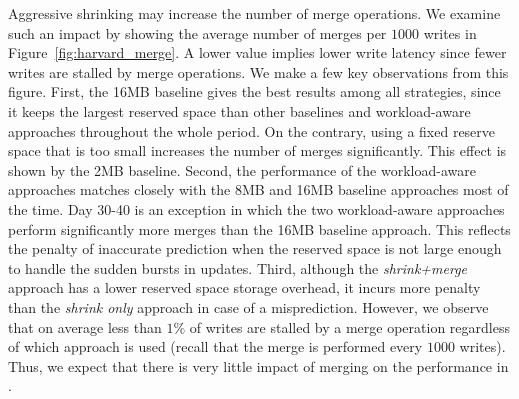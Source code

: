 Aggressive shrinking may increase the number of merge
operations. We examine such an impact by showing the average number of merges
per $1000$ writes in Figure~\ref{fig:harvard_merge}. A lower value implies lower
write latency since fewer writes are stalled by merge operations.  We make a
few key observations from this figure. First, the 16MB baseline gives the
best results among all strategies, since it keeps the largest reserved space
than other baselines and workload-aware approaches throughout the whole
period. On the contrary, using a fixed reserve space that is too small
increases the number of merges significantly. This effect is shown by the 2MB
baseline. Second, the performance of the workload-aware approaches matches
closely with the 8MB and 16MB baseline approaches most of the time.  Day 30-40
is an exception in which the two workload-aware approaches perform
significantly more merges than the 16MB baseline approach. This reflects
the penalty of inaccurate prediction when the reserved space is not large
enough to handle the sudden bursts in updates.  Third, although the
\textit{shrink+merge} approach has a lower reserved space storage overhead, it
incurs more penalty than the \textit{shrink only} approach in case of a
misprediction. However, we observe that on average less than $1\%$ of writes
are stalled by a merge operation regardless of which approach is used (recall
that the merge is performed every $1000$ writes).  Thus, we expect that there
is very little impact of merging on the performance in \PLR.


